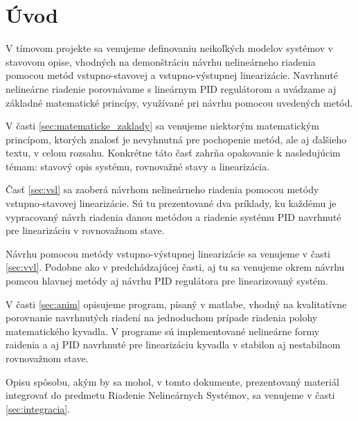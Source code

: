 \newpage
{}
{
	\section{Úvod}
}
{
}

    V tímovom projekte sa venujeme definovaniu neikoľkých modelov systémov v stavovom opise, vhodných na demonštráciu návrhu nelineárneho riadenia pomocou metód vstupno-stavovej a vstupno-výstupnej linearizácie. Navrhnuté nelineárne riadenie porovnávame s lineárnym PID regulátorom a uvádzame aj základné matematické princípy, využívané pri návrhu pomocou uvedených metód.

    V časti \ref{sec:matematicke_zaklady} sa venujeme niektorým matematickým princípom, ktorých znalosť je nevyhnutná pre pochopenie metód, ale aj ďalšieho textu, v celom rozsahu. Konkrétne táto časť zahrňa opakovanie k nasledujúcim témam: stavový opis systému, rovnovažné stavy a linearizácia. 
    
    Časť \ref{sec:vsl} sa zaoberá návrhom nelineárneho riadenia pomocou metódy vstupno-stavovej linearizácie. Sú tu prezentované dva príklady, ku každému je vypracovaný návrh riadenia danou metódou a riadenie systému PID navrhnuté pre linearizáciu v rovnovažnom stave.

    Návrhu pomocou metódy vstupno-výstupnej linearizácie sa venujeme v časti \ref{sec:vvl}. Podobne ako v predchádzajúcej časti, aj tu sa venujeme okrem návrhu pomcou hlavnej metódy aj návrhu PID regulátora pre linearizovaný systém.

    V časti \ref{sec:anim} opisujeme program, písaný v matlabe, vhodný na kvalitatívne porovnanie navrhnutých riadení na jednoduchom prípade riadenia polohy matematického kyvadla. V programe sú implementované nelineárne formy raidenia a aj PID navrhnuté pre linearizáciu kyvadla v stabilon aj nestabilnom rovnovažnom stave.

    Opisu spôsobu, akým by sa mohol, v tomto dokumente, prezentovaný materiál integrovať do predmetu Riadenie Nelineárnych Systémov, sa venujeme v časti \ref{sec:integracia}.
